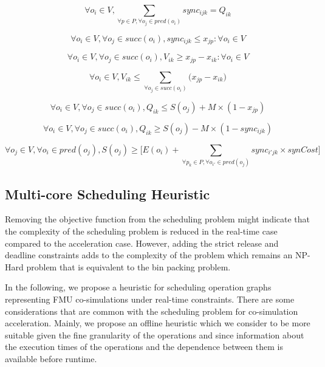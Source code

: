 \begin{equation}
\forall o_i \in V, \sum_{\forall p \in P, \forall o_j \in pred(o_i)}sync_{ijk}= Q_{ik}
\label{schedRT:const_3}
\end{equation}

\begin{equation}
\forall o_i \in V, \forall o_j \in succ(o_i), sync_{ijk} \leq x_{jp}: \forall o_i \in V
\label{schedRT:const_4}
\end{equation}

\begin{equation}
\forall o_i \in V, \forall o_j \in succ(o_i), V_{ik} \geq x_{jp} - x_{ik}: \forall o_i \in V
\label{schedRT:const_5}
\end{equation}

\begin{equation}
 \forall o_i \in V, V_{ik} \leq \sum_{\forall o_j \in succ(o_i)}\big(x_{jp} - x_{ik}\big)
\label{schedRT:const_6}
\end{equation}

\begin{equation}
\forall o_i \in V, \forall o_j \in succ(o_i), Q_{ik} \leq S(o_j) + M \times (1-x_{jp})
\label{schedRT:const_7}
\end{equation}

\begin{equation}
\forall o_i \in V, \forall o_j \in succ(o_i), Q_{ik} \geq S(o_j) - M \times (1-sync_{ijk})
\label{schedRT:const_8}
\end{equation}

\begin{equation}
\forall o_j \in V, \forall o_i \in pred(o_j), S(o_j) \geq \Big[E(o_i) + \sum_{\forall p_k \in P, \forall o_{i'} \in pred(o_j)}sync_{i'jk}\times synCost\Big]
\label{schedRT:const_9}
\end{equation}

\subsection{Multi-core Scheduling Heuristic}

Removing the objective function from the scheduling problem might indicate that the complexity of the scheduling problem is reduced in the real-time case compared to the acceleration case. However, adding the strict release and deadline constraints adds to the complexity of the problem which remains an NP-Hard problem that is equivalent to the bin packing problem.

In the following, we propose a heuristic for scheduling operation graphs representing FMU co-simulations under real-time constraints. There are some considerations that are common with the scheduling problem for co-simulation acceleration. Mainly, we propose an offline heuristic which we consider to be more suitable given the fine granularity of the operations and since information about the execution times of the operations and the dependence between them is available before runtime.

